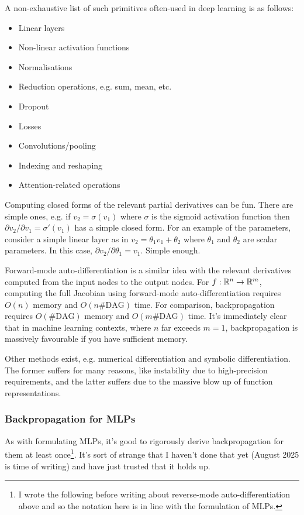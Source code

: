 \documentclass[11pt]{article}
\begin{document}
A non-exhaustive list of such primitives often-used in deep learning is as follows:
\begin{itemize}[label=--, itemsep=0pt, topsep=2pt]
    \item Linear layers
    \item Non-linear activation functions
    \item Normalisations
    \item Reduction operations, e.g. sum, mean, etc.
    \item Dropout
    \item Losses
    \item Convolutions/pooling
    \item Indexing and reshaping
    \item Attention-related operations
\end{itemize}
Computing closed forms of the relevant partial derivatives can be fun. There are simple ones, e.g. if $v_2=\sigma(v_1)$ where $\sigma$ is the sigmoid activation function then $\partial v_2/\partial v_1=\sigma'(v_1)$ has a simple closed form. For an example of the parameters, consider a simple linear layer as in $v_2=\theta_1v_1+\theta_2$ where $\theta_1$ and $\theta_2$ are scalar parameters. In this case, $\partial v_2/\partial\theta_1=v_1$. Simple enough.

\begin{tcolorbox}[title={\centering\textbf{Why not forward-mode auto-differentiation?}}, colback=myLightBlue, colbacktitle=myDarkBlue, colframe=myDarkBlue, coltitle=white]
    Forward-mode auto-differentiation is a similar idea with the relevant derivatives computed from the input nodes to the output nodes. For $f:\mathbb{R}^n\to\mathbb{R}^m$, computing the full Jacobian using forward-mode auto-differentiation requires $O(n)$ memory and $O(n\#\text{DAG})$ time. For comparison, backpropagation requires $O(\#\text{DAG})$ memory and $O(m\#\text{DAG})$ time. It's immediately clear that in machine learning contexts, where $n$ far exceeds $m=1$, backpropagation is massively favourable if you have sufficient memory.

    \hspace{14.5pt}Other methods exist, e.g. numerical differentiation and symbolic differentiation. The former suffers for many reasons, like instability due to high-precision requirements, and the latter suffers due to the massive blow up of function representations.
\end{tcolorbox}

\subsubsection{Backpropagation for MLPs}
As with formulating MLPs, it's good to rigorously derive backpropagation for them at least once\footnote{I wrote the following before writing about reverse-mode auto-differentiation above and so the notation here is in line with the formulation of MLPs.}. It's sort of strange that I haven't done that yet (August 2025 is time of writing) and have just trusted that it holds up.
\end{document}
